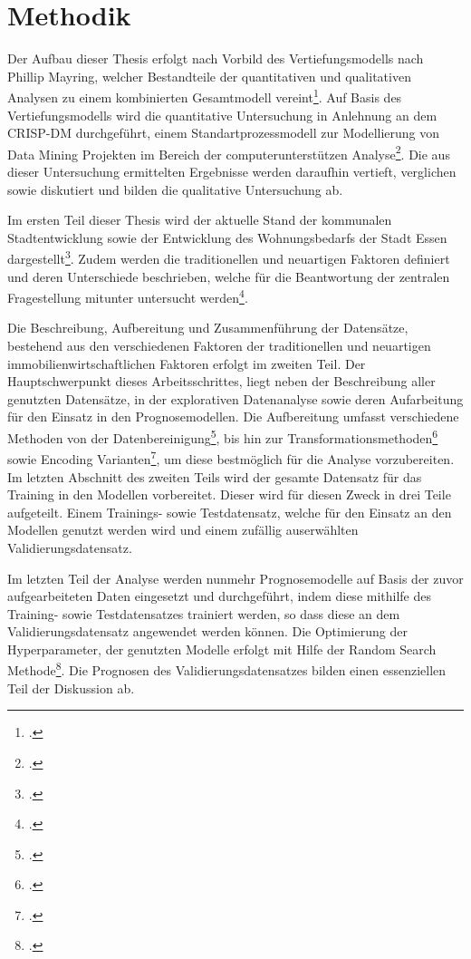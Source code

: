 \section{Methodik}
Der Aufbau dieser Thesis erfolgt nach Vorbild des Vertiefungsmodells 
nach Phillip Mayring, welcher Bestandteile der quantitativen und 
qualitativen Analysen zu einem kombinierten Gesamtmodell vereint\footcite[Vgl. ][]{Mayring2001}.  
Auf Basis des Vertiefungsmodells wird die quantitative Untersuchung 
in Anlehnung an dem CRISP-DM durchgeführt, einem Standartprozessmodell 
zur Modellierung von Data Mining Projekten im Bereich der 
computerunterstützen Analyse\footcite[Vgl. ][]{Wirth2000}. Die aus dieser Untersuchung 
ermittelten Ergebnisse werden daraufhin vertieft, verglichen sowie diskutiert und 
bilden die qualitative Untersuchung ab.

Im ersten Teil dieser Thesis wird der aktuelle Stand der kommunalen Stadtentwicklung 
sowie der Entwicklung des Wohnungsbedarfs der Stadt Essen dargestellt\footcite[Vgl. ][]{StadtEssen2018}. 
Zudem werden die traditionellen und neuartigen Faktoren definiert und deren Unterschiede 
beschrieben, welche für die Beantwortung der zentralen Fragestellung mitunter 
untersucht werden\footcite[Vgl. ][]{Asaftei2018}.

Die Beschreibung, Aufbereitung und Zusammenführung der Datensätze, bestehend aus den 
verschiedenen Faktoren der traditionellen und neuartigen immobilienwirtschaftlichen 
Faktoren erfolgt im zweiten Teil. Der Hauptschwerpunkt dieses Arbeitsschrittes, liegt 
neben der Beschreibung aller genutzten Datensätze, in der explorativen Datenanalyse sowie 
deren Aufarbeitung für den Einsatz in den Prognosemodellen. Die Aufbereitung umfasst 
verschiedene Methoden von der Datenbereinigung\footcite[Vgl. ][]{Rahm2000}, bis hin zur 
Transformationsmethoden\footcite[Vgl. ][]{Box1964} sowie Encoding Varianten\footcite[Vgl. ][]{Cerda2018}, 
um diese bestmöglich für die Analyse vorzubereiten. Im letzten Abschnitt des zweiten 
Teils wird der gesamte Datensatz für das Training in den Modellen 
vorbereitet. Dieser wird für diesen Zweck in drei Teile aufgeteilt. Einem Trainings- 
sowie Testdatensatz, welche für den Einsatz an den Modellen genutzt werden wird und 
einem zufällig auserwählten Validierungsdatensatz.

Im letzten Teil der Analyse werden nunmehr Prognosemodelle auf Basis der zuvor 
aufgearbeiteten Daten eingesetzt und durchgeführt, indem diese mithilfe des Training- sowie Testdatensatzes 
trainiert werden, so dass diese an dem Validierungsdatensatz angewendet werden können.
Die Optimierung der Hyperparameter, der genutzten Modelle erfolgt mit Hilfe der Random 
Search Methode\footcite[Vgl. ][]{Bergstra2012}. Die Prognosen des Validierungsdatensatzes 
bilden einen essenziellen Teil der Diskussion ab. 

